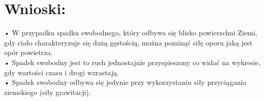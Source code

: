 \documentclass{article}
\begin{document}
\section{Wnioski:}
         •	W przypadku spadku swobodnego, który odbywa się blisko powierzchni Ziemi, gdy ciało charakteryzuje się dużą gęstością, można pominąć siłę oporu jaką jest opór powietrza.\\
         •	Spadek swobodny jest to ruch jednostajnie przyspieszony co widać na wykresie, gdy wartości czasu i drogi wzrastają.\\
        •	Spadek swobodny odbywa się jedynie przy wykorzystaniu siły przyciągania ziemskiego (siły grawitacji).\\
\end{document}
